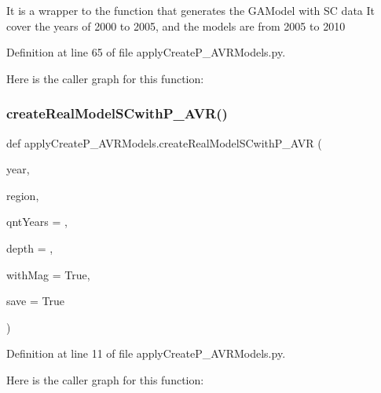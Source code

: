 \begin{DoxyVerb}It is a wrapper to the function that generates the GAModel with SC data
It cover the years of 2000 to 2005, and the models are from 2005 to 2010
\end{DoxyVerb}
 

Definition at line 65 of file apply\+Create\+P\+\_\+\+A\+V\+R\+Models.\+py.

Here is the caller graph for this function\+:
\mbox{\label{namespaceapply_create_p___a_v_r_models_a27dea38c91f34c55c0c69108573986d2}} 
\subsubsection{\texorpdfstring{create\+Real\+Model\+S\+Cwith\+P\+\_\+\+A\+V\+R()}{createRealModelSCwithP\_AVR()}}
{\footnotesize\ttfamily def apply\+Create\+P\+\_\+\+A\+V\+R\+Models.\+create\+Real\+Model\+S\+Cwith\+P\+\_\+\+A\+VR (\begin{DoxyParamCaption}\item[{}]{year,  }\item[{}]{region,  }\item[{}]{qnt\+Years = {},  }\item[{}]{depth = {},  }\item[{}]{with\+Mag = {\ttfamily True},  }\item[{}]{save = {\ttfamily True} }\end{DoxyParamCaption})}



Definition at line 11 of file apply\+Create\+P\+\_\+\+A\+V\+R\+Models.\+py.

Here is the caller graph for this function\+:
\mbox{\label{namespaceapply_create_p___a_v_r_models_a5d841325fbbaef43baf47142199d52ca}} 
